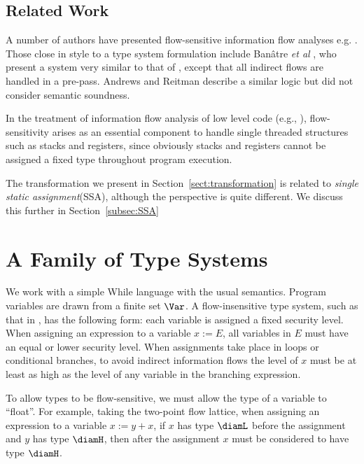 \documentclass{sigplanconf}
\begin{document}
\subsection{Related Work}
A number of authors have presented flow-sensitive information flow
analyses e.g. \cite{Clark+:JCL}.
Those close in style to a type system formulation include Ban\^atre
\emph{et al} \cite{Banatre:Bryce:LeMetayer:ESORICS94}, who present a
system very similar to that of \cite{Amtoft:Banerjee:SAS04}, except
that all indirect flows are handled in a pre-pass. Andrews and Reitman 
describe a similar logic \cite{Andrews:Reitman:Axiomatic} but 
did not consider semantic soundness. 

In the treatment of information flow analysis of low level code (e.g.,
\cite{GenaimS05,Hedin:Sands:Timing}), flow-sensitivity arises as an essential
component to handle single threaded structures such as stacks and
registers, since obviously stacks and registers cannot be assigned a
fixed type throughout program execution.

The transformation we present in Section~\ref{sect:transformation} is 
related to \emph{single static assignment}(SSA)\cite{SSA}, although the perspective is quite different. We discuss this further in Section~\ref{subsec:SSA}


\section{A Family of Type Systems}
\label{sect:family}

We work with a simple While language with the usual semantics.
Program variables are drawn from a finite set $\Var$.
A flow-insensitive type system, such as that in \cite{Volpano:Smith:Irvine:Sound},
has the following form: each variable is assigned a fixed security
level. When assigning an expression to a variable $x := E$, all
variables in $E$ must have an equal or lower security level.  When
assignments take place in loops or conditional branches, to avoid
indirect information flows the level of $x$ must be at least as high
as the level of any variable in the branching expression.

To allow types to be flow-sensitive, we must allow the type of a variable to ``float''. 
For example, taking the two-point flow lattice, 
when assigning an expression to a variable $x := y + x$, 
if $x$ has type $\diamL$ before the assignment and $y$ has type $\diamH$, then 
after the assignment $x$ must be considered to have type $\diamH$. 
\end{document}
